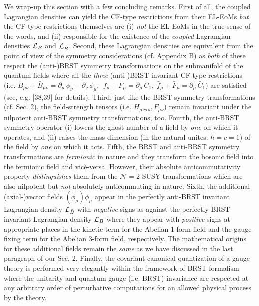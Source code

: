 \documentclass[12pt]{article}
\begin{document}
We wrap-up  this section with a few concluding remarks. First of all, the coupled Lagrangian densities can yield the CF-type
restrictions from their EL-EoMs {\it but} the CF-type restrictions themselves are (i) {\it not} the
EL-EoMs in the true sense of the words, and (ii) responsible for the existence of the {\it coupled} 
Lagrangian densities ${\cal L}_{B}$ and ${\cal L}_{\bar B}$. Second, these Lagrangian densities are equivalent
from the point of view of the symmetry considerations (cf. Appendix B) as {\it both} of these respect the (anti-)BRST symmetry transformations 
on the submanifold of the quantum  fields where all the {\it three} (anti-)BRST invariant CF-type restrictions
(i.e. $B_{\mu\nu} + \bar B_{\mu\nu} = \partial_\mu\, \phi_\nu - \partial_\nu\, \phi_\mu, 
\,\;  f_\mu + F_\mu = \partial_\mu\, C_1, \; \bar f_\mu + \bar F_\mu = \partial_\mu\, \bar C_1$) 
are satisfied (see, e.g. [38,39] for details). Third, just like the BRST symmetry transformations (cf. Sec. 2), the field-strength tensors
(i.e. $ H_{\mu\nu\sigma\rho}, F_{\mu\nu}$) remain invariant under the nilpotent anti-BRST symmetry transformations, too. Fourth,
the anti-BRST symmetry operator (i) lowers the ghost number of a field by {\it one} on which it operates, and (ii) 
raises the mass dimension (in the natural unites: $\hbar = c = 1 $)
of the field by {\it one} on which it acts. Fifth, the BRST and anti-BRST symmetry
transformations are {\it fermionic} in nature and they transform the bosonic field into the fermionic field and vic{\`e}-versa.  
However, their absolute anticommutativity property {\it distinguishes} them from the $\mathcal {N} = 2$ SUSY transformations
which are also nilpotent but {\it not} absolutely anticommuting in nature. Sixth, the additional (axial-)vector fields $(\widetilde \phi_\mu)\phi_\mu$
appear in the perfectly anti-BRST invariant Lagrangian density ${\cal L}_{\bar B}$ with {\it negative} signs as against the perfectly BRST
invariant Lagrangian density ${\cal L}_{B}$ where they appear with {\it positive} signs at appropriate places in the kinetic term for the
Abelian 1-form field and the gauge-fixing term for the Abelian 3-form field, respectively. The mathematical origins for these additional fields
remain the {\it same} as we have discussed in the last paragraph of our Sec. 2.
Finally, the covariant canonical quantization of a
gauge theory is performed very elegantly within the framework of BRST formalism where the unitarity and 
quantum gauge (i.e. BRST) invariance are respected
at any arbitrary order of perturbative computations for an allowed physical process by the theory.\\
\end{document}
